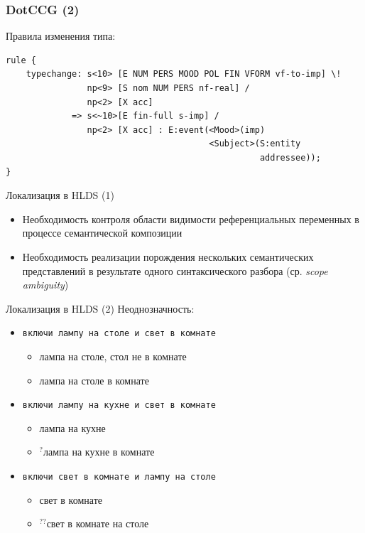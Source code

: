 \documentclass{beamer}
\begin{document}
\begin{frame}[fragile]
\frametitle{DotCCG (2)}
Правила изменения типа:
{\footnotesize \begin{verbatim}
rule {
    typechange: s<10> [E NUM PERS MOOD POL FIN VFORM vf-to-imp] \! 
                np<9> [S nom NUM PERS nf-real] / 
                np<2> [X acc]
             => s<~10>[E fin-full s-imp] / 
                np<2> [X acc] : E:event(<Mood>(imp) 
                                        <Subject>(S:entity 
                                                  addressee));
}
\end{verbatim}}
\end{frame}

\begin{frame}{Локализация в HLDS (1)}
\begin{itemize}
	\item Необходимость контроля области видимости референциальных переменных в процессе семантической композиции
	\item Необходимость реализации порождения нескольких семантических представлений в результате одного синтаксического разбора (ср. \textit{scope ambiguity})
\end{itemize}
\end{frame}

\begin{frame}{Локализация в HLDS (2)}
Неоднозначность:\\
\bigskip
\begin{itemize}
	\item \texttt{включи лампу на столе и свет в комнате}
		\begin{itemize}
			\item {\footnotesize лампа на столе, стол не в комнате}
			\item {\footnotesize лампа на столе в комнате}
		\end{itemize}
	\bigskip
	\item \texttt{включи лампу на кухне и свет в комнате}
		\begin{itemize}
			\item {\footnotesize лампа на кухне}
			\item {\footnotesize $^?$лампа на кухне в комнате}
		\end{itemize}
	\bigskip
	\item \texttt{включи свет в комнате и лампу на столе}
		\begin{itemize}
			\item {\footnotesize свет в комнате}
			\item {\footnotesize $^{??}$свет в комнате на столе}
		\end{itemize}
\end{itemize}
\end{frame}
\end{document}
